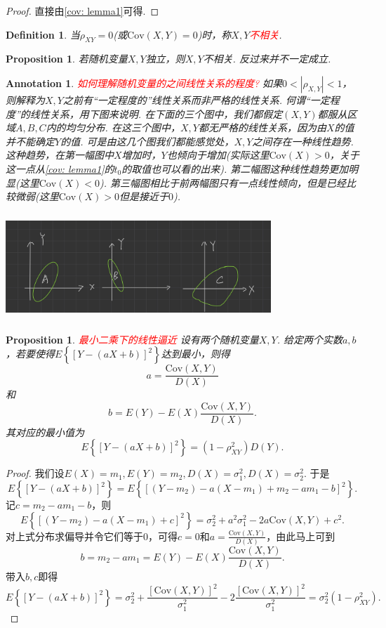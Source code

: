 \documentclass{article}
\newtheorem{proposition}[theorem]{Proposition}
\newtheorem{definition}[theorem]{Definition}
\newtheorem{annotation}[theorem]{Annotation}
\newcommand{\redt}[1]{\textcolor{red}{#1}}
\begin{document}
\begin{proof}
直接由\ref{cov: lemma1}可得.
\end{proof}

\begin{definition}
\rm 当$\rho_{XY}=0$(或$\text{Cov}(X,Y)=0$)时，称$X,Y$\redt{不相关}.
\end{definition}

\begin{proposition}
\rm 若随机变量$X,Y$独立，则$X,Y$不相关. 反过来并不一定成立. 
\end{proposition}

\begin{annotation}
\rm \redt{如何理解随机变量的之间线性关系的程度?} 如果$0 < |\rho_{X,Y}| < 1$，则解释为$X,Y$之前有“一定程度的”线性关系而非严格的线性关系. 何谓“一定程度”的线性关系，用下图来说明. 在下面的三个图中，我们都假定$(X,Y)$都服从区域$A,B,C$内的均匀分布. 在这三个图中，$X,Y$都无严格的线性关系，因为由$X$的值并不能确定$Y$的值. 可是由这几个图我们都能感觉处，$X,Y$之间存在一种线性趋势. 这种趋势，在第一幅图中$X$增加时，$Y$也倾向于增加(实际这里$\text{Cov}(X)>0$，关于这一点从\ref{cov: lemma1}的$t_0$的取值也可以看的出来). 第二幅图这种线性趋势更加明显(这里$\text{Cov}(X) < 0$). 第三幅图相比于前两幅图只有一点线性倾向，但是已经比较微弱(这里$\text{Cov}(X)>0$但是接近于$0$). 
\begin{center}
\includegraphics[width=10cm, height=4cm]{images/covariance.jpg}
\end{center}
\end{annotation}

\begin{proposition}
\rm \redt{最小二乘下的线性逼近} 设有两个随机变量$X,Y$. 给定两个实数$a,b$，若要使得$E\left\{\left[Y-(aX+b) \right]^2\right\}$达到最小，则得
$$
a  = \frac{\text{Cov}(X,Y)}{D(X)}
$$
和
$$
b = E(Y)-E(X)\frac{\text{Cov}(X,Y)}{D(X)}.
$$
其对应的最小值为
$$
E\left\{\left[Y-(aX+b) \right]^2\right\} = (1-\rho_{XY}^2)D(Y).
$$
\end{proposition}

\begin{proof}
我们设$E(X)=m_1,E(Y)=m_2,D(X)=\sigma_1^2,D(X)=\sigma_2^2$. 于是
$$
E\left\{\left[Y-(aX+b) \right]^2\right\} = E\left\{\left[(Y-m_2)-a(X-m_1)+ m_2 -am_1 - b \right]^2\right\}.
$$
记$c = m_2 -am_1 - b$，则
$$
E\left\{\left[(Y-m_2)-a(X-m_1)+ c \right]^2\right\} = \sigma_2^2 + a^2\sigma_1^2-2a\text{Cov}(X,Y) + c^2 .
$$
对上式分布求偏导并令它们等于0，可得$c=0$和$a = \frac{\text{Cov}(X,Y)}{D(X)}$，由此马上可到
$$
b = m_2-am_1 = E(Y)-E(X)\frac{\text{Cov}(X,Y)}{D(X)}.
$$
带入$b,c$即得
$$
E\left\{\left[Y-(aX+b) \right]^2\right\} = \sigma_2^2 + \frac{[\text{Cov}(X,Y)]^2}{\sigma_1^2}-2\frac{[\text{Cov}(X,Y)]^2}{\sigma_1^2} = \sigma_2^2(1-\rho_{XY}^2).
$$
\end{proof}
\end{document}
